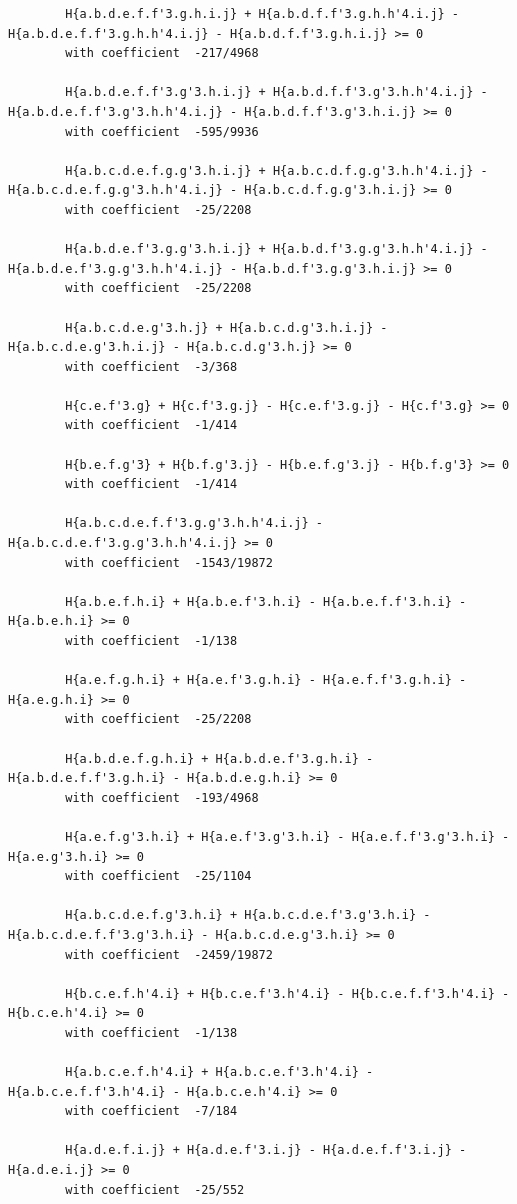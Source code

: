 \documentclass[11pt, a4paper]{kybernetika}
\begin{document}
\begin{verbatim}
		H{a.b.d.e.f.f'3.g.h.i.j} + H{a.b.d.f.f'3.g.h.h'4.i.j} - H{a.b.d.e.f.f'3.g.h.h'4.i.j} - H{a.b.d.f.f'3.g.h.i.j} >= 0
		with coefficient  -217/4968
		
		H{a.b.d.e.f.f'3.g'3.h.i.j} + H{a.b.d.f.f'3.g'3.h.h'4.i.j} - H{a.b.d.e.f.f'3.g'3.h.h'4.i.j} - H{a.b.d.f.f'3.g'3.h.i.j} >= 0
		with coefficient  -595/9936
		
		H{a.b.c.d.e.f.g.g'3.h.i.j} + H{a.b.c.d.f.g.g'3.h.h'4.i.j} - H{a.b.c.d.e.f.g.g'3.h.h'4.i.j} - H{a.b.c.d.f.g.g'3.h.i.j} >= 0
		with coefficient  -25/2208
		
		H{a.b.d.e.f'3.g.g'3.h.i.j} + H{a.b.d.f'3.g.g'3.h.h'4.i.j} - H{a.b.d.e.f'3.g.g'3.h.h'4.i.j} - H{a.b.d.f'3.g.g'3.h.i.j} >= 0
		with coefficient  -25/2208
		
		H{a.b.c.d.e.g'3.h.j} + H{a.b.c.d.g'3.h.i.j} - H{a.b.c.d.e.g'3.h.i.j} - H{a.b.c.d.g'3.h.j} >= 0
		with coefficient  -3/368
		
		H{c.e.f'3.g} + H{c.f'3.g.j} - H{c.e.f'3.g.j} - H{c.f'3.g} >= 0
		with coefficient  -1/414
		
		H{b.e.f.g'3} + H{b.f.g'3.j} - H{b.e.f.g'3.j} - H{b.f.g'3} >= 0
		with coefficient  -1/414
		
		H{a.b.c.d.e.f.f'3.g.g'3.h.h'4.i.j} - H{a.b.c.d.e.f'3.g.g'3.h.h'4.i.j} >= 0
		with coefficient  -1543/19872
		
		H{a.b.e.f.h.i} + H{a.b.e.f'3.h.i} - H{a.b.e.f.f'3.h.i} - H{a.b.e.h.i} >= 0
		with coefficient  -1/138
		
		H{a.e.f.g.h.i} + H{a.e.f'3.g.h.i} - H{a.e.f.f'3.g.h.i} - H{a.e.g.h.i} >= 0
		with coefficient  -25/2208
		
		H{a.b.d.e.f.g.h.i} + H{a.b.d.e.f'3.g.h.i} - H{a.b.d.e.f.f'3.g.h.i} - H{a.b.d.e.g.h.i} >= 0
		with coefficient  -193/4968
		
		H{a.e.f.g'3.h.i} + H{a.e.f'3.g'3.h.i} - H{a.e.f.f'3.g'3.h.i} - H{a.e.g'3.h.i} >= 0
		with coefficient  -25/1104
		
		H{a.b.c.d.e.f.g'3.h.i} + H{a.b.c.d.e.f'3.g'3.h.i} - H{a.b.c.d.e.f.f'3.g'3.h.i} - H{a.b.c.d.e.g'3.h.i} >= 0
		with coefficient  -2459/19872
		
		H{b.c.e.f.h'4.i} + H{b.c.e.f'3.h'4.i} - H{b.c.e.f.f'3.h'4.i} - H{b.c.e.h'4.i} >= 0
		with coefficient  -1/138
		
		H{a.b.c.e.f.h'4.i} + H{a.b.c.e.f'3.h'4.i} - H{a.b.c.e.f.f'3.h'4.i} - H{a.b.c.e.h'4.i} >= 0
		with coefficient  -7/184
		
		H{a.d.e.f.i.j} + H{a.d.e.f'3.i.j} - H{a.d.e.f.f'3.i.j} - H{a.d.e.i.j} >= 0
		with coefficient  -25/552
		

\end{verbatim}
\end{document}
